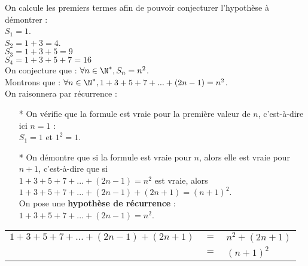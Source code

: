 On calcule les premiers termes afin de pouvoir conjecturer l'hypothèse à démontrer : \\

$S_1 = 1$. \\

$S_2 = 1 + 3 = 4$. \\

$S_3 = 1 + 3 + 5 = 9$ \\

$S_4 = 1 + 3 + 5 + 7 = 16$ \\

On conjecture que : $\forall n \in \N^*, S_n = n^2$. \\

Montrons que : $\forall n \in \N^*, 1 + 3 + 5 + 7 + ... + \left(2n-1\right) = n^2$. \\

On raisonnera par récurrence : \\

\begin{itemize}

\item[*] On vérifie que la formule est vraie pour la première valeur de $n$, c'est-à-dire ici $n = 1$ : \vspace{.3cm} \\ $S_1 = 1$ et $1^2 = 1$. \\

\item[*] On démontre que si la formule est vraie pour $n$, alors elle est vraie pour $n+1$, c'est-à-dire que si \\ $1 + 3 + 5 + 7 + ... + \left(2n-1\right) = n^2$ est vraie, alors $1 + 3 + 5 + 7 + ... + \left(2n-1\right) + \left(2n +1\right) = \left(n+1\right)^2.$ \vspace{.3cm} \\ On pose une \textbf{hypothèse de récurrence} : $1 + 3 + 5 + 7 + ... + \left(2n-1\right) = n^2$.
\end{itemize}

\vspace*{.3cm}

\begin{tabular}{lll}
$1 + 3 + 5 + 7 + ... + \left(2n-1\right) + \left(2n+1\right)$ & $ = $ & $ n^2 + \left(2n+1\right)$ \vspace*{.3cm} \\
& $=$ & $\left(n+1\right)^2$ \\
\end{tabular}

